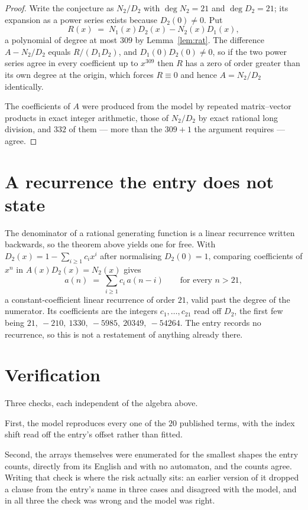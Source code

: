 \documentclass[11pt,a4paper]{article}
\theoremstyle{plain}
\theoremstyle{definition}
\begin{document}
\begin{proof}
Write the conjecture as $N_2/D_2$ with $\deg N_2=21$ and $\deg D_2=21$; its expansion as a
power series exists because $D_2(0)\neq0$. Put
\[
R(x)\;=\;N_1(x)D_2(x)-N_2(x)D_1(x),
\]
a polynomial of degree at most $309$ by Lemma~\ref{lem:rat}. The difference
$A-N_2/D_2$ equals $R/(D_1D_2)$, and $D_1(0)D_2(0)\neq0$, so if the two power series agree in
every coefficient up to $x^{309}$ then $R$ has a zero of order greater than its own
degree at the origin, which forces $R\equiv0$ and hence $A=N_2/D_2$ identically.

The coefficients of $A$ were produced from the model by repeated matrix--vector products in
exact integer arithmetic, those of $N_2/D_2$ by exact rational long division, and $332$
of them --- more than the $309+1$ the argument requires --- agree.
\end{proof}

\section{A recurrence the entry does not state}

The denominator of a rational generating function is a linear recurrence written backwards, so
the theorem above yields one for free. With $D_2(x)=1-\sum_{i\ge1}c_ix^i$ after normalising
$D_2(0)=1$, comparing coefficients of $x^n$ in $A(x)D_2(x)=N_2(x)$ gives
\[
a(n)\;=\;\sum_{i\ge1}c_i\,a(n-i)\qquad\text{for every }n>21,
\]
a constant-coefficient linear recurrence of order $21$, valid past the degree of the
numerator. Its coefficients are the integers $c_1,\dots,c_{21}$ read off $D_2$, the first few being $21,\ -210,\ 1330,\ -5985,\ 20349,\ -54264$. The entry records no recurrence, so this is not a restatement of anything
already there.

\section{Verification}

Three checks, each independent of the algebra above.

First, the model reproduces every one of the $20$ published terms, with the index shift
read off the entry's offset rather than fitted.

Second, the arrays themselves were enumerated for the smallest shapes the entry counts,
directly from its English and with no automaton, and the counts agree. Writing that check is
where the risk actually sits: an earlier version of it dropped a clause from the entry's name
in three cases and disagreed with the model, and in all three the check was wrong and the model
was right.
\end{document}
